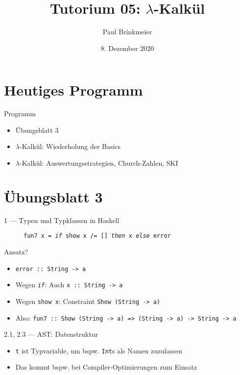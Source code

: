 \documentclass{beamer}
\title{Tutorium 05: $\lambda$-Kalkül}
\author{Paul Brinkmeier}
\institute{Tutorium Programmierparadigmen am KIT}
\date{8. Dezember 2020}
\begin{document}
\begin{frame}
	\titlepage
\end{frame}

\section{Heutiges Programm}
\begin{frame}{Programm}
	\begin{itemize}
		\item Übungsblatt 3
		\item $\lambda$-Kalkül: Wiederholung der Basics
                \item $\lambda$-Kalkül: Auswertungsstrategien, Church-Zahlen, SKI
	\end{itemize}
\end{frame}

\section{Übungsblatt 3}

\begin{frame}{1 --- Typen und Typklassen in Haskell}
  \begin{figure}
    \texttt{fun7 x = \emph{if} show x /= [] \emph{then} x \emph{else} error}
  \end{figure}

  \vfill

  Ansatz?

  \pause

  \begin{itemize}
    \item \texttt{error :: String -> a}
    \item Wegen \texttt{\emph{if}}: Auch \texttt{x :: String -> a}
    \item Wegen \texttt{show x}: Constraint \texttt{Show (String -> a)}
    \item Also: \texttt{fun7 :: Show (String -> a) => (String -> a) -> String -> a}
  \end{itemize}
\end{frame}

\begin{frame}{2.1, 2.3 --- AST: Datenstruktur}

	\begin{itemize}
		\item \texttt{t} ist Typvariable, um bspw. \texttt{Int}s als Namen zuzulassen
		\item Das kommt bspw. bei Compiler-Optimierungen zum Einsatz
	\end{itemize}
\end{frame}
\end{document}
